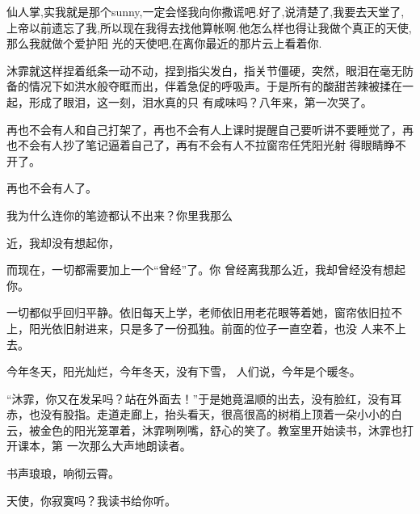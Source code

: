 \documentclass{article}
\begin{document}
仙人掌,实我就是那个sunny,一定会怪我向你撒谎吧.好了,说清楚了,我要去天堂了,上帝以前遗忘了我,所以现在我得去找他算帐啊.他怎么样也得让我做个真正的天使,那么我就做个爱护阳
光的天使吧,在离你最近的那片云上看着你. 

沐霏就这样捏着纸条一动不动，捏到指尖发白，指关节僵硬，突然，眼泪在毫无防备的情况下如洪水般夺眶而出，伴着急促的呼吸声。于是所有的酸甜苦辣被揉在一起，形成了眼泪，这一刻，泪水真的只
有咸味吗？八年来，第一次哭了。 

再也不会有人和自己打架了，再也不会有人上课时提醒自己要听讲不要睡觉了，再也不会有人抄了笔记逼着自己了，再有不会有人不拉窗帘任凭阳光射
得眼睛睁不开了。 


再也不会有人了。 

我为什么连你的笔迹都认不出来？你里我那么
\newpage

近，我却没有想起你， 

而现在，一切都需要加上一个“曾经”了。你
曾经离我那么近，我却曾经没有想起你。 

一切都似乎回归平静。依旧每天上学，老师依旧用老花眼等着她，窗帘依旧拉不上，阳光依旧射进来，只是多了一份孤独。前面的位子一直空着，也没
人来不上去。 

今年冬天，阳光灿烂，今年冬天，没有下雪，
人们说，今年是个暖冬。 

“沐霏，你又在发呆吗？站在外面去！”于是她竟温顺的出去，没有脸红，没有耳赤，也没有股指。走道走廊上，抬头看天，很高很高的树梢上顶着一朵小小的白云，被金色的阳光笼罩着，沐霏咧咧嘴，舒心的笑了。教室里开始读书，沐霏也打开课本，第
一次那么大声地朗读者。 


\newpage

书声琅琅，响彻云霄。 

天使，你寂寞吗？我读书给你听。
\end{document}
